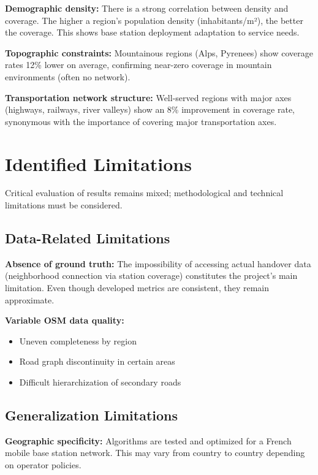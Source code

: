 \documentclass[12pt,a4paper]{report}
\begin{document}
\textbf{Demographic density:} There is a strong correlation between density and coverage. The higher a region's population density (inhabitants/m²), the better the coverage. This shows base station deployment adaptation to service needs.

\textbf{Topographic constraints:} Mountainous regions (Alps, Pyrenees) show coverage rates 12\% lower on average, confirming near-zero coverage in mountain environments (often no network).

\textbf{Transportation network structure:} Well-served regions with major axes (highways, railways, river valleys) show an 8\% improvement in coverage rate, synonymous with the importance of covering major transportation axes.

\section{Identified Limitations}

Critical evaluation of results remains mixed; methodological and technical limitations must be considered.

\subsection{Data-Related Limitations}

\textbf{Absence of ground truth:} The impossibility of accessing actual handover data (neighborhood connection via station coverage) constitutes the project's main limitation. Even though developed metrics are consistent, they remain approximate.

\textbf{Variable OSM data quality:}
\begin{itemize}
    \item Uneven completeness by region
    \item Road graph discontinuity in certain areas
    \item Difficult hierarchization of secondary roads
\end{itemize}

\subsection{Generalization Limitations}

\textbf{Geographic specificity:} Algorithms are tested and optimized for a French mobile base station network. This may vary from country to country depending on operator policies.
\end{document}
